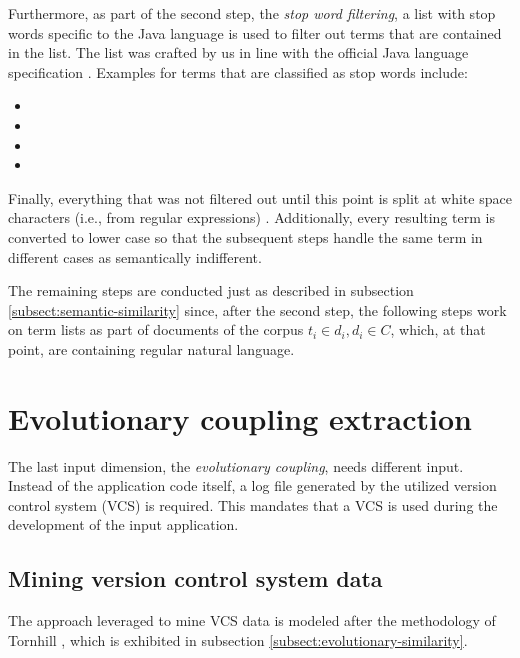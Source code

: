 \documentclass[12pt,a4paper]{report}
\begin{document}
Furthermore, as part of the second step, the \textit{stop word filtering}, a
list with stop words specific to the Java language is used to filter out terms
that are contained in the list. The list was crafted by us in line with the
official Java language specification \cite{oracle-java11}. Examples for terms
that are classified as stop words include:
\begin{itemize}[noitemsep]
  \item {}
  \item {}
  \item {}
  \item {}
\end{itemize}

Finally, everything that was not filtered out until this point is split at
white space characters (i.e.,  from regular expressions)
\cite{ieee1992posix}. Additionally, every resulting term is converted to
lower case so that the subsequent steps handle the same term in different cases
as semantically indifferent.

The remaining steps are conducted just as described in subsection
\ref{subsect:semantic-similarity} since, after the second step, the following
steps work on term lists as part of documents of the corpus
\(t_i \in d_i, d_i \in C\), which, at that point, are containing regular natural language.



\section{Evolutionary coupling extraction} \label{sect:evolutionary-coupling-extraction}

The last input dimension, the \textit{evolutionary coupling}, needs different
input. Instead of the application code itself, a log file generated by the
utilized version control system (VCS) is required. This mandates that a VCS is
used during the development of the input application.


\subsection{Mining version control system data}

The approach leveraged to mine VCS data is modeled after the methodology of
Tornhill \cite{tornhill2015crimescene}, which is exhibited in subsection
\ref{subsect:evolutionary-similarity}.
\end{document}
